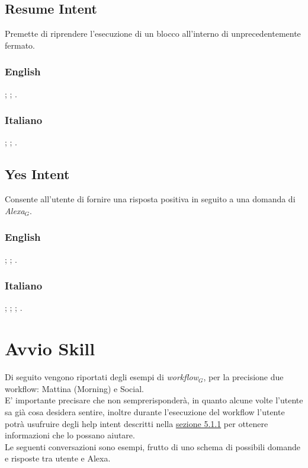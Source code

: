 \subsection{Resume Intent}
Premette di riprendere l'esecuzione di un blocco all'interno di unprecedentemente fermato.
\subsubsection{English}
\begin{itemize}
	
	;
	;
	.
	
\end{itemize}

\subsubsection{Italiano}
\begin{itemize}
	;
	;
	.
	
\end{itemize}



\subsection{Yes Intent}
Consente all'utente di fornire una risposta positiva in seguito a una domanda di \textit{Alexa$_{G}$}.
\subsubsection{English}
\begin{itemize}
	
	;
	;
	.
	
\end{itemize}

\subsubsection{Italiano}
\begin{itemize}
	;
	;
	;
	.		
\end{itemize}

\section{Avvio Skill}
Di seguito vengono riportati degli esempi di \textit{workflow$_{G}$}, per la precisione due workflow: Mattina (Morning) e Social. \\
E' importante precisare che non semprerisponderà, in quanto alcune volte l'utente sa già cosa desidera sentire, inoltre durante l'esecuzione del workflow l'utente potrà usufruire degli help intent descritti nella \hyperref[help]{sezione 5.1.1} per ottenere informazioni che lo possano aiutare. \\
Le seguenti conversazioni sono esempi, frutto di uno schema di possibili domande e risposte tra utente e Alexa.

